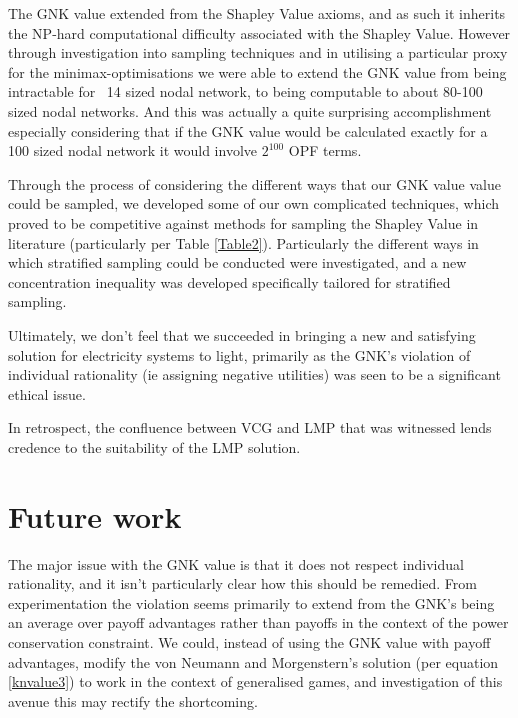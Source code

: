 The GNK value extended from the Shapley Value axioms, and as such it inherits the NP-hard computational difficulty associated with the Shapley Value.
However through investigation into sampling techniques and in utilising a particular proxy for the minimax-optimisations we were able to extend the GNK value from being intractable for ~14 sized nodal network, to being computable to about 80-100 sized nodal networks.
And this was actually a quite surprising accomplishment especially considering that if the GNK value would be calculated exactly for a 100 sized nodal network it would involve $2^{100}$ OPF terms.

Through the process of considering the different ways that our GNK value value could be sampled, we developed some of our own complicated techniques, which proved to be competitive against methods for sampling the Shapley Value in literature (particularly per Table \ref{Table2}).
Particularly the different ways in which stratified sampling could be conducted were investigated, and a new concentration inequality was developed specifically tailored for stratified sampling.

Ultimately, we don't feel that we succeeded in bringing a new and satisfying solution for electricity systems to light, primarily as the GNK's violation of individual rationality (ie assigning negative utilities) was seen to be a significant ethical issue.

In retrospect, the confluence between VCG and LMP that was witnessed lends credence to the suitability of the LMP solution.


\section{Future work}
\label{sec:future}

The major issue with the GNK value is that it does not respect individual rationality, and it isn't particularly clear how this should be remedied.
From experimentation the violation seems primarily to extend from the GNK's being an average over payoff advantages rather than payoffs in the context of the power conservation constraint.
We could, instead of using the GNK value with payoff advantages, modify the von Neumann and Morgenstern's solution (per equation \ref{knvalue3}) to work in the context of generalised games, and investigation of this avenue this may rectify the shortcoming.

